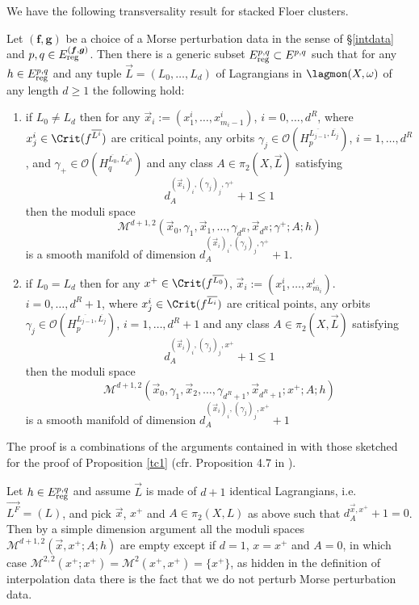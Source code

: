 	
	\noindent We have the following transversality result for stacked Floer clusters.
	\begin{prop}\label{stacktrans}
		Let $(\boldsymbol{f}, \boldsymbol{g})$ be a choice of a Morse perturbation data in the sense of \S \ref{intdata} and $p,q\in E^{(\boldsymbol{f}, \boldsymbol{g})}_\textnormal{reg}$. Then there is a generic subset $E^{p,q}_\textnormal{reg}\subset E^{p,q}$ such that for any $h\in E^{p,q}_\textnormal{reg}$ and any tuple $\vec{L}=(L_0,\ldots, L_d)$ of Lagrangians in $\lagmon(X,\omega)$ of any length $d\geq 1$ the following hold:
		\begin{enumerate}
			\item if $L_0\neq L_d$ then for any $\vec{x}_i:=(x^i_1,\ldots,x^i_{m_i-1})$, $i=0,\ldots,d^R$, where $x^i_j\in \Crit(f^{\overline{L^i}})$ are critical points, any orbits $\gamma_j\in \mathcal{O}(H^{\overline{L_{j-1}},\overline{L_j}}_p)$, $i=1,\ldots,d^R$, and $\gamma_+\in \mathcal{O}(H^{\overline{L_0},\overline{L_{d^R}}}_q)$ and any class $A\in \pi_2(X,\vec{L})$ satisfying $$d_{A}^{(\vec{x}_i)_i, (\gamma_j)_j,\gamma^+}+1\leq 1$$ then the moduli space $$\mathcal{M}^{d+1,2}\left(\vec{x}_0, \gamma_1, \vec{x}_1,\ldots,\gamma_{d^R}, \vec{x}_{d^R}; \gamma^+;A;h\right)$$ is a smooth manifold of dimension $d_{A}^{(\vec{x}_i)_i, (\gamma_j)_j,\gamma^+}+1$.
			\item if $L_0=L_d$ then for any $x^+\in \Crit(f^{\overline{L_0}})$, $\vec{x}_i:=(x_1^i,\ldots,x_{\overline{m_i}}^i)$. $i=0,\ldots,d^R+1$, where $x^i_j\in \Crit(f^{\overline{L_i}})$ are critical points, any orbits $\gamma_j\in \mathcal{O}(H^{\overline{L_{j-1}},\overline{L_j}}_p)$, $i=1,\ldots,d^R+1$ and any class $A\in \pi_2(X,\vec{L})$ satisfying $$d_{A}^{(\vec{x}_i)_i, (\gamma_j)_j,x^+}+1\leq 1$$ then the moduli space $$\mathcal{M}^{d+1,2}\left(\vec{x}_0, \gamma_1, \vec{x}_2,\ldots,\gamma_{d^R+1}, \vec{x}_{d^R+1}; x^+;A;h\right)$$ is a smooth manifold of dimension $d_{A}^{(\vec{x}_i)_i, (\gamma_j)_j,x^+}+1$
		\end{enumerate}
	\end{prop}
	\noindent The proof is a combinations of the arguments contained in \cite{Sylvan2019OnCategories} with those sketched for the proof of Proposition \ref{tc1} (cfr. Proposition 4.7 in \cite{Sheridan2011OnPants}).
	\begin{rem}\label{dR=0functors}
		Let $h\in E^{p,q}_\textnormal{reg}$ and assume $\vec{L}$ is made of $d+1$ identical Lagrangians, i.e. $\vec{L^F}=(L)$, and pick $\vec{x}$, $x^+$ and $A\in \pi_2(X,L)$ as above such that $d_{A}^{\vec{x},x^+}+1=0$. Then by a simple dimension argument all the moduli spaces $\mathcal{M}^{d+1,2}(\vec{x},x^+;A;h)$ are empty except if $d=1$, $x=x^+$ and $A=0$, in which case $\mathcal{M}^{2,2}(x^+;x^+)= \mathcal{M}^2(x^+,x^+)=\{x^+\}$, as hidden in the definition of interpolation data there is the fact that we do not perturb Morse perturbation data.
	\end{rem}
	
